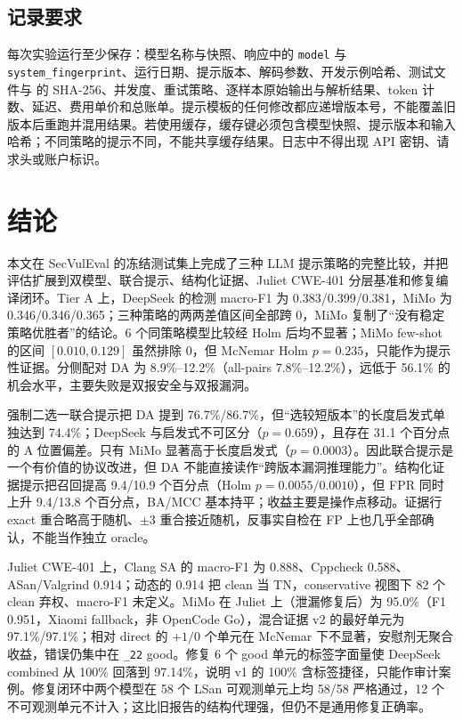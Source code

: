 \documentclass[conference]{IEEEtran}
\begin{document}
\subsection{记录要求}
每次实验运行至少保存：模型名称与快照、响应中的 \texttt{model} 与 \texttt{system\_fingerprint}、运行日期、提示版本、解码参数、开发示例哈希、测试文件与  的 SHA-256、并发度、重试策略、逐样本原始输出与解析结果、token 计数、延迟、费用单价和总账单。提示模板的任何修改都应递增版本号，不能覆盖旧版本后重跑并混用结果。若使用缓存，缓存键必须包含模型快照、提示版本和输入哈希；不同策略的提示不同，不能共享缓存结果。日志中不得出现 API 密钥、请求头或账户标识。

\section{结论}
\label{sec:conclusion}
本文在 SecVulEval 的冻结测试集上完成了三种 LLM 提示策略的完整比较，并把评估扩展到双模型、联合提示、结构化证据、Juliet CWE-401 分层基准和修复编译闭环。Tier A 上，DeepSeek 的检测 macro-F1 为 0.383/0.399/0.381，MiMo 为 0.346/0.346/0.365；三种策略的两两差值区间全部跨 0，MiMo 复制了“没有稳定策略优胜者”的结论。6 个同策略模型比较经 Holm 后均不显著；MiMo few-shot 的区间 $[0.010,0.129]$ 虽然排除 0，但 McNemar Holm $p=0.235$，只能作为提示性证据。分侧配对 DA 为 8.9\%--12.2\%（all-pairs 7.8\%--12.2\%），远低于 56.1\% 的机会水平，主要失败是双报安全与双报漏洞。

强制二选一联合提示把 DA 提到 76.7\%/86.7\%，但“选较短版本”的长度启发式单独达到 74.4\%；DeepSeek 与启发式不可区分（$p=0.659$），且存在 31.1 个百分点的 A 位置偏差。只有 MiMo 显著高于长度启发式（$p=0.0003$）。因此联合提示是一个有价值的协议改进，但 DA 不能直接读作“跨版本漏洞推理能力”。结构化证据提示把召回提高 9.4/10.9 个百分点（Holm $p=0.0055/0.0010$），但 FPR 同时上升 9.4/13.8 个百分点，BA/MCC 基本持平；收益主要是操作点移动。证据行 exact 重合略高于随机、$\pm3$ 重合接近随机，反事实自检在 FP 上也几乎全部确认，不能当作独立 oracle。

Juliet CWE-401 上，Clang SA 的 macro-F1 为 0.888、Cppcheck 0.588、ASan/Valgrind 0.914；动态的 0.914 把 clean 当 TN，conservative 视图下 82 个 clean 弃权、macro-F1 未定义。MiMo 在 Juliet 上（泄漏修复后）为 95.0\%（F1 0.951，Xiaomi fallback，非 OpenCode Go），混合证据 v2 的最好单元为 97.1\%/97.1\%；相对 direct 的 $+1/0$ 个单元在 McNemar 下不显著，安慰剂无聚合收益，错误仍集中在 \texttt{\_22} good。修复 6 个 good 单元的标签字面量使 DeepSeek combined 从 100\% 回落到 97.14\%，说明 v1 的 100\% 含标签捷径，只能作审计案例。修复闭环中两个模型在 58 个 LSan 可观测单元上均 58/58 严格通过，12 个不可观测单元不计入；这比旧报告的结构代理强，但仍不是通用修复正确率。
\end{document}
